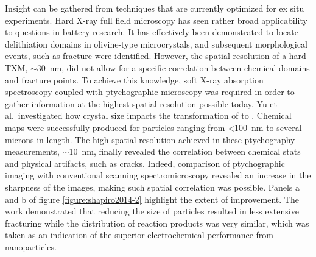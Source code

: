 \documentclass[journal=cmatex,manuscript=perspective]{achemso}
\begin{document}
Insight can be gathered from techniques that are currently optimized
for ex situ experiments. Hard X-ray full field microscopy has seen
rather broad applicability to questions in battery research. It has
effectively been demonstrated to locate delithiation domains in
olivine-type  microcrystals, and subsequent morphological
events, such as fracture were
identified\cite{boesenberg2013}. However, the spatial resolution of a
hard TXM, $\sim$\SI{30}{nm}, did not allow for a specific correlation
between chemical domains and fracture points. To achieve this
knowledge, soft X-ray absorption spectroscopy coupled with
ptychographic microscopy was required in order to gather information
at the highest spatial resolution possible today. Yu et
al.\ investigated how crystal size impacts the transformation of
 to \cite{yu2015-2}. Chemical maps were
successfully produced for particles ranging from <\SI{100}{nm} to
several microns in length. The high spatial resolution achieved in
these ptychography measurements, $\sim$\SI{10}{nm}, finally revealed the
correlation between chemical stats and physical artifacts, such as
cracks. Indeed, comparison of ptychographic imaging with conventional
scanning spectromicroscopy revealed an increase in the sharpness of
the images, making such spatial correlation was possible. Panels a and
b of figure \ref{figure:shapiro2014-2} highlight the extent of
improvement\cite{shapiro2014}. The work demonstrated that reducing the
size of  particles resulted in less extensive fracturing
while the distribution of reaction products was very similar, which
was taken as an indication of the superior electrochemical performance
from  nanoparticles\cite{yu2015-2}.
\end{document}

